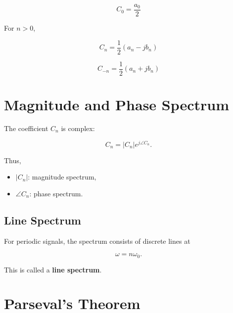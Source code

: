 \[
\boxed{
C_0=\frac{a_0}{2}
}
\]

For \(n>0\),

\[
\boxed{
C_n=\frac{1}{2}(a_n-jb_n)
}
\]

\[
\boxed{
C_{-n}=\frac{1}{2}(a_n+jb_n)
}
\]


\section{Magnitude and Phase Spectrum}

The coefficient \(C_n\) is complex:

\[
C_n=|C_n|e^{j\angle C_n}.
\]

Thus,

\begin{itemize}
\item \(|C_n|\): magnitude spectrum,
\item \(\angle C_n\): phase spectrum.
\end{itemize}


\subsection{Line Spectrum}

For periodic signals, the spectrum consists of discrete lines at

\[
\omega=n\omega_0.
\]

\begin{center}
\end{center}

This is called a \textbf{line spectrum}.


\section{Parseval's Theorem}

